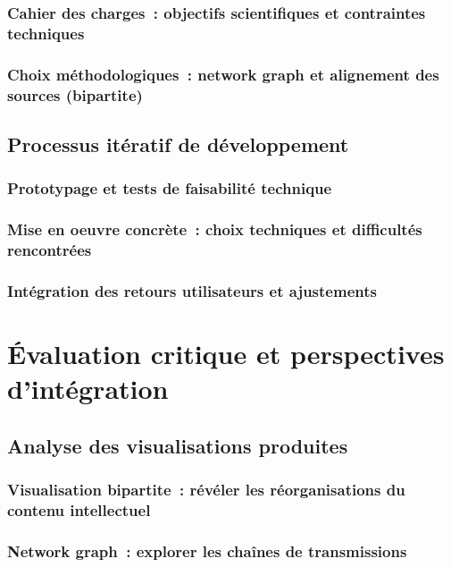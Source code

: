 \documentclass[a4paper,12pt,twoside]{book}
\newcommand{\clearemptydoublepage}{\newpage{\pagestyle{empty}\cleardoublepage}}
\begin{document}
	\section{Cahier des charges~: objectifs scientifiques et contraintes techniques}

	\section{Choix méthodologiques~: network graph et alignement des sources (bipartite)}

	\clearemptydoublepage

	\chapter{Processus itératif de développement}
	\section{Prototypage et tests de faisabilité technique}

	\section{Mise en oeuvre concrète~: choix techniques et difficultés rencontrées}

	\section{Intégration des retours utilisateurs et ajustements}

	\clearemptydoublepage

	\part{Évaluation critique et perspectives d'intégration}
	\chapter{Analyse des visualisations produites}
	\section{Visualisation bipartite~: révéler les réorganisations du contenu intellectuel}

	\section{Network graph~: explorer les chaînes de transmissions}
\end{document}
